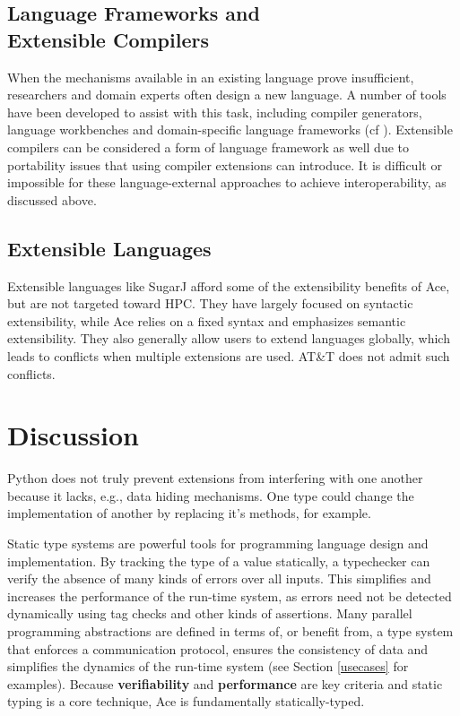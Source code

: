 \documentclass[9pt,preprint]{sigplanconf}
\begin{document}
\subsection{Language Frameworks and \\Extensible Compilers}
When the mechanisms available in an existing language prove insufficient, researchers and domain experts often design a new language. A number of tools have been developed to assist with this task, including compiler generators, language workbenches and domain-specific language frameworks (cf \cite{fowler2010domain}). Extensible compilers can be considered a form of language framework as well due to portability issues that using compiler extensions can introduce. It is difficult or impossible for these language-external approaches to achieve interoperability, as discussed above.

\subsection{Extensible Languages}
Extensible languages like SugarJ \cite{erdweg2011sugarj} afford some of the extensibility benefits of Ace, but are not targeted toward HPC. They have largely focused on syntactic extensibility, while Ace relies on a fixed syntax and emphasizes semantic extensibility. They also generally allow users to extend languages globally, which leads to conflicts when multiple extensions are used. AT\&T does not admit such conflicts.

\section{Discussion}\label{discussion}
Python does not truly prevent extensions from interfering with one another because it lacks, e.g., data hiding mechanisms. One type could change the implementation of another by replacing it's methods, for example.

Static type systems are powerful tools for programming language design and implementation. By tracking the type of a value statically, a typechecker can verify the absence of many kinds of errors over all inputs. This simplifies and increases the performance of the run-time system, as errors need not be detected dynamically using tag checks and other kinds of assertions. Many parallel programming abstractions are defined in terms of, or benefit from, a type system that enforces a communication protocol, ensures the consistency of data and simplifies the dynamics of the run-time system (see Section \ref{usecases} for examples). Because \textbf{verifiability} and \textbf{performance} are key criteria and static typing is a core technique, Ace is fundamentally statically-typed.
\end{document}

